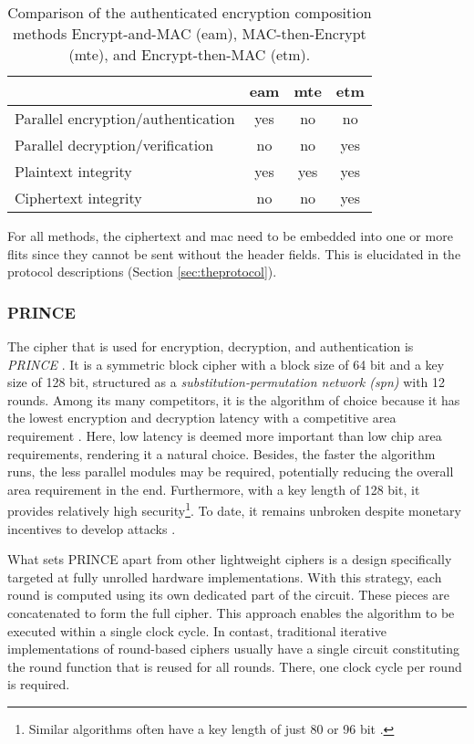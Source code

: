 \begin{table}
    \centering
    \begin{tabulary}{\textwidth}{L|CCC}
        & \gls{eam} & \gls{mte} & \gls{etm} \\\hline
        Parallel encryption/authentication & yes & no & no \\
        Parallel decryption/verification & no & no & yes \\
        Plaintext integrity & yes & yes & yes \\
        Ciphertext integrity & no & no & yes
    \end{tabulary}
    \caption[Comparison of authenticated encryption composition methods]{Comparison of the authenticated encryption composition methods
    Encrypt-and-MAC (\gls{eam}), MAC-then-Encrypt (\gls{mte}), and Encrypt-then-MAC (\gls{etm}).}
    \label{tab:compositionmethods}
\end{table}

For all methods, the ciphertext and \gls{mac} need to be embedded into one or more flits since they cannot be sent without the header fields. This is
elucidated in the protocol descriptions (Section \ref{sec:theprotocol}).

\subsubsection{PRINCE}\label{subsubsec:prince}
The cipher that is used for encryption, decryption, and authentication is \textit{PRINCE} \cite{borghoff12prince}. It is a symmetric block cipher with
a block size of 64 bit and a key size of 128 bit, structured as a \textit{substitution-permutation network (\gls{spn})} with 12 rounds. Among its many
competitors, it is the algorithm of choice because it has the lowest encryption and decryption latency with a competitive area requirement
\cite{harttung17lightweightcrypto}. Here, low latency is deemed more important than low chip area requirements, rendering it a natural choice. Besides, the
faster the algorithm runs, the less parallel modules may be required, potentially reducing the overall area requirement in the end. Furthermore, with a
key length of 128 bit, it provides relatively high security\footnote{Similar algorithms often have a key length of just 80 or 96 bit
\cite[5]{harttung17lightweightcrypto}.}. To date, it remains unbroken despite monetary incentives to develop attacks \cite{princechallenge}.

What sets PRINCE apart from other lightweight ciphers is a design specifically targeted at fully unrolled hardware implementations. With this
strategy, each round is computed using its own dedicated part of the circuit. These pieces are concatenated to form the full cipher. This approach
enables the algorithm to be executed within a single clock cycle. In contast, traditional iterative implementations of round-based ciphers usually
have a single circuit constituting the round function that is reused for all rounds. There, one clock cycle per round is required.

